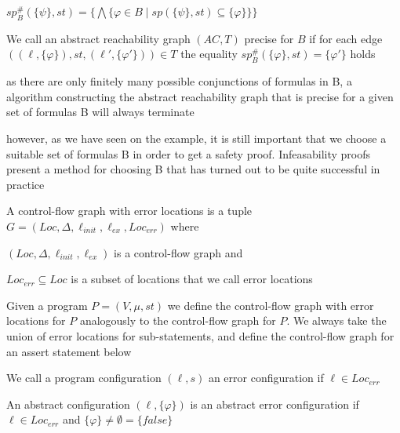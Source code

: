 \documentclass[landscape, a4paper]{article}
\begin{document}
\begin{minipage}[t]{0.2\linewidth}
\begin{betterlist}
\begin{betterlist}
			\item $sp^\#_B(\{ \psi \} , st) = \{\bigwedge \{\varphi \in B \mid sp(\{ \psi \}, st) \subseteq \{ \varphi \}\}\}$
		\end{betterlist}
		\item \color{orange}We call an abstract reachability graph $(AC, T)$ \alert{precise for $B$} if for each edge $((\ell, \{\varphi\}), st, (\ell', \{\varphi'\})) \in T$ the equality $sp^\#_B(\{\varphi\}, st) = \{\varphi'\}$ holds\color{black}
		\item as there are only finitely many possible conjunctions of formulas in B, a algorithm constructing the abstract reachability graph that is precise for a given set of formulas B will always terminate
		\item however, as we have seen on the example, it is still important that we choose a suitable set of formulas B in order to get a safety proof. Infeasability proofs present a method for choosing B that has turned out to be quite successful in practice
	\end{betterlist}
	\begin{betterlist}
		\item \color{orange}A \alert{control-flow graph with error locations} is a tuple $G = (Loc, \Delta, \ell_{init}, \ell_{ex}, Loc_{err})$ where
		\begin{betterlist}
			\item $(Loc, \Delta, \ell_{init}, \ell_{ex})$ is a control-flow graph and
			\item $Loc_{err} \subseteq Loc$ is a subset of locations that we call \alert{error locations}
		\end{betterlist}\color{black}
		\item Given a program $P = (V, \mu, st)$ we define the \alert{control-flow graph with error locations for $P$} analogously to the control-flow graph for $P$. We always take the union of error locations for sub-statements, and define the control-flow graph for an assert statement below
		\begin{betterlist}
			\item {}
		\end{betterlist}
		\item \color{orange}We call a program configuration $(\ell, s)$ an \alert{error configuration} if $\ell \in Loc_{err}$\color{black}
		\item \color{orange}An abstract configuration $(\ell, \{\varphi\})$ is an \alert{abstract error configuration} if $\ell \in Loc_{err}$ and $\{\varphi\}\ne \emptyset = \{false\}$\color{black}

\end{betterlist}
\end{minipage}
\end{document}
